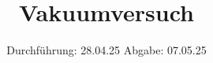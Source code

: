 

\subject{V070}
\title{Vakuumversuch}
\date{%
  Durchführung: 28.04.25
  \hspace{3em}
  Abgabe: 07.05.25
}



\maketitle
\thispagestyle{empty}
\tableofcontents
\newpage



%

%

\printbibliography{}


